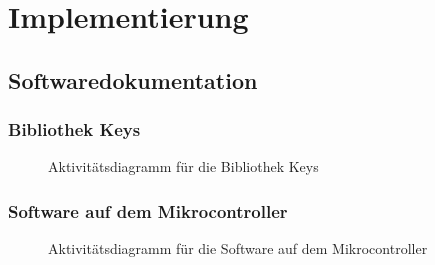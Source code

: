 \chapter{Implementierung}




\section{Softwaredokumentation}
\subsection{Bibliothek Keys}
\begin{figure}
  \centering
  \caption{Aktivitätsdiagramm für die Bibliothek Keys}
  \label{diagram_keys}
\end{figure}

\subsection{Software auf dem Mikrocontroller}
\begin{figure}
  \centering
  \caption{Aktivitätsdiagramm für die Software auf dem Mikrocontroller}
  \label{diagram_arduino}
\end{figure}



